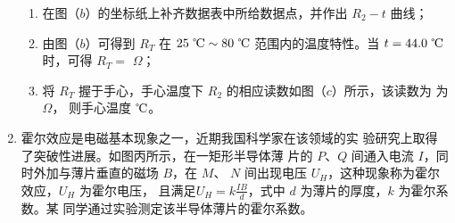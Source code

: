 \begin{enumerate}
\begin{enumerate}
\item 
在图（$ b $）的坐标纸上补齐数据表中所给数据点，并作出 $ R_{2} -t $ 曲线；


\item 
由图（$ b $）可得到 $ R_T $ 在 $ 25 \ \celsius \sim 80 \ \celsius $ 范围内的温度特性。当 $ t=44.0 \ \celsius $ 时，可得 $ R_T= $ \underlinegap $ \Omega $；

\item 
将 $ R_T $ 握于手心，手心温度下 $ R_{2} $ 的相应读数如图（$ c $）所示，该读数为
为
\underlinegap 
$ \Omega $，
则手心温度
\underlinegap 
$ \celsius $。


\end{enumerate}






\item 
{}
霍尔效应是电磁基本现象之一，近期我国科学家在该领域的实
验研究上取得了突破性进展。如图丙所示，在一矩形半导体薄
片的 $ P $、$ Q $ 间通入电流 $ I $，同时外加与薄片垂直的磁场 $ B $，在 $ M $、
$ N $ 间出现电压 $ U_H $，这种现象称为霍尔效应，$ U_H $ 为霍尔电压，
且满足$U_{H}=k \frac{I B}{d}$，式中 $ d $ 为薄片的厚度，$ k $ 为霍尔系数。某
同学通过实验测定该半导体薄片的霍尔系数。
\begin{figure}[h!]
\centering
\begin{subfigure}{0.4\linewidth}
\centering
 
\caption{}\label{}
\end{subfigure}
\begin{subfigure}{0.4\linewidth}
\centering
 
\caption{}\label{}
\end{subfigure}


\end{figure}
\end{enumerate}
